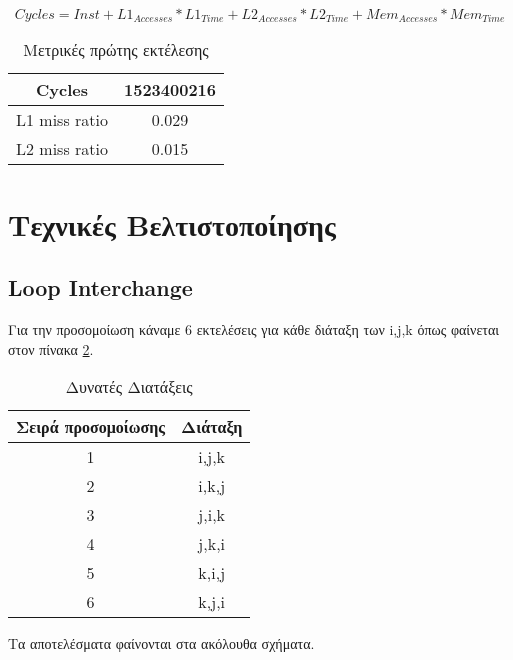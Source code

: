 \documentclass[a4paper,12pt]{article}
\begin{document}
\begin{equation}
    Cycles = Inst + L1_{Accesses} * L1_{Time} + L2_{Accesses} * L2_{Time} +
    Mem_{Accesses} * Mem_{Time}
\end{equation} 

\begin{table}[H]
    \centering
    \begin{tabular}{| c | c |}
        \hline
        Cycles & 1523400216 \\
        \hline
        L1 miss ratio & 0.029 \\
        \hline
        L2 miss ratio & 0.015 \\
        \hline
    \end{tabular}
    \caption{Μετρικές πρώτης εκτέλεσης}
    \label{fig:T3}
\end{table}


\section*{Τεχνικές Βελτιστοποίησης}

\subsection{Loop Interchange}

Για την προσομοίωση κάναμε 6 εκτελέσεις για κάθε διάταξη των i,j,k όπως
φαίνεται στον πίνακα \ref{fig:T1}.

\begin{table}[H]
    \centering
    \begin{tabular}{| c | c |}
        \hline
        Σειρά προσομοίωσης & Διάταξη \\
        \hline
        \hline
        1   &  i,j,k \\
        \hline
        2   &  i,k,j \\
        \hline
        3   &  j,i,k \\
        \hline
        4   &  j,k,i \\
        \hline
        5   &  k,i,j \\
        \hline
        6   &  k,j,i \\
        \hline
    \end{tabular}
    \caption{Δυνατές Διατάξεις}
    \label{fig:T1}
\end{table}


Τα αποτελέσματα φαίνονται στα ακόλουθα σχήματα.
\end{document}
